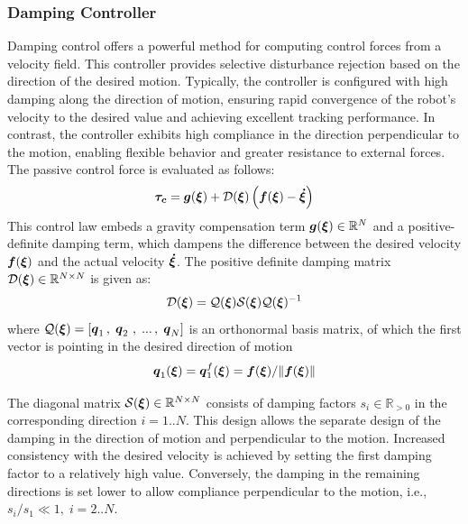\subsubsection{Damping Controller}
Damping control \cite{kronander2015passive} offers a powerful method for computing control forces from a velocity field. This controller provides selective disturbance rejection based on the direction of the desired motion. Typically, the controller is configured with high damping along the direction of motion, ensuring rapid convergence of the robot's velocity to the desired value and achieving excellent tracking performance. In contrast, the controller exhibits high compliance in the direction perpendicular to the motion, enabling flexible behavior and greater resistance to external forces. The passive control force is evaluated as follows:
\begin{equation}
	\vecs{\tau_c} = \vect g (\vecs\xi) 
	+ \matd{D}(\vecs\xi) \left(\vecs f(\vecs\xi) - \vecs{\dot\xi} \right) 
\label{eq:control_command}
\end{equation}
This control law embeds a gravity compensation term $\boldsymbol{g} (\boldsymbol{\xi}) \in \mathbb{R}^N$ and a positive-definite damping term, which dampens the difference between the desired velocity $\boldsymbol{f}(\boldsymbol{\xi})$ and the actual velocity $\boldsymbol{\dot\xi}$.
The positive definite damping matrix $\mathcal{D}(\boldsymbol{\xi}) \in \mathbb{R}^{N \times N}$ is given as:
\begin{equation}
   \matd {D}(\vecs \xi) = \matd{Q}(\vecs\xi)\matd{S}(\vecs\xi) \matd{Q} (\vecs \xi)^{-1}
\label{eq:damping_matrix}
\end{equation}
where $\mathcal{Q}(\boldsymbol{\xi}) = \left[ \boldsymbol{q}_1 \, , \; \boldsymbol{q}_2\ , \; ... \, , \; \boldsymbol{q}_N \right] $ is an orthonormal basis matrix, of which the first vector is pointing in the desired direction of motion
\begin{equation}
    \vecs q_1(\vecs \xi) = \vecs q_1^f(\vecs \xi) = \vect f({\vecs \xi}) / \lVert \vect f({\vecs \xi}) \rVert \label{eq:velocity_unit_vector}
\end{equation}

The diagonal matrix $\mathcal{S}(\boldsymbol{\xi}) \in \mathbb{R}^{N \times N}$ consists of damping factors $s_i \in \mathbb{R}_{>0}$ in the corresponding direction $i = 1 .. N$.
This design allows the separate design of the damping in the direction of motion and perpendicular to the motion.
Increased consistency with the desired velocity is achieved by setting the first damping factor to a relatively high value. Conversely, the damping in the remaining directions is set lower to allow compliance perpendicular to the motion, i.e., $s_i / s_1 \ll 1, \; i = 2 .. N$.

